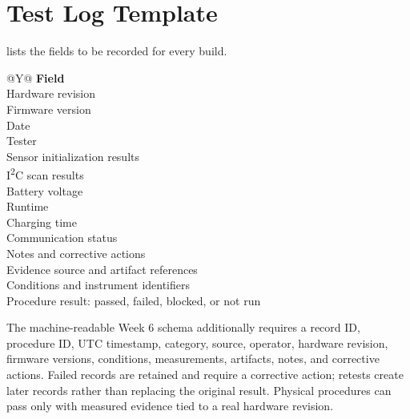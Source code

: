 \section{Test Log Template}
\label{sec:test-log-template}

 lists the fields to be recorded for every build.

\begin{table}[H]
\centering
\caption{Test log template fields.}
\label{tab:test-log-fields}
\small
\begin{tabularx}{\columnwidth}{@{}Y@{}}
\toprule
\textbf{Field} \\
\midrule
Hardware revision \\
Firmware version \\
Date \\
Tester \\
Sensor initialization results \\
I\textsuperscript{2}C scan results \\
Battery voltage \\
Runtime \\
Charging time \\
Communication status \\
Notes and corrective actions \\
Evidence source and artifact references \\
Conditions and instrument identifiers \\
Procedure result: passed, failed, blocked, or not run \\
\bottomrule
\end{tabularx}
\end{table}

The machine-readable Week 6 schema additionally requires a record ID, procedure ID, UTC timestamp, category, source, operator, hardware revision, firmware versions, conditions, measurements, artifacts, notes, and corrective actions. Failed records are retained and require a corrective action; retests create later records rather than replacing the original result. Physical procedures can pass only with measured evidence tied to a real hardware revision.
